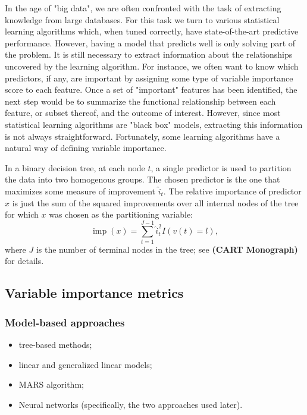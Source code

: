 \documentclass{article}
\def\ref#1{\textbf{(#1)}}
\DeclareMathOperator{\imp}{imp}
\begin{document}
In the age of "big data", we are often confronted with the task of extracting knowledge from large databases. For this task we turn to various statistical learning algorithms which, when tuned correctly, have state-of-the-art predictive performance. However, having a model that predicts well is only solving part of the problem. It is still necessary to extract information about the relationships uncovered by the learning algorithm. For instance, we often want to know which predictors, if any, are important by assigning some type of variable importance score to each feature. Once a set of "important" features has been identified, the next step would be to summarize the functional relationship between each feature, or subset thereof, and the outcome of interest. However, since most statistical learning algorithms are "black box" models, extracting this information is not always straightforward. Fortunately, some learning algorithms have a natural way of defining variable importance.

In a binary decision tree, at each node $t$, a single predictor is used to partition the data into two homogenous groups. The chosen predictor is the one that maximizes some measure of improvement $\widehat{i}_t$. The relative importance of predictor $x$ is just the sum of the squared improvements over all internal nodes of the tree for which $x$ was chosen as the partitioning variable:
\begin{equation}
\imp\left(x\right) = \sum_{t = 1}^{J - 1}\widehat{i}_t^2 I\left(v\left(t\right) = l\right),
\end{equation}
where $J$ is the number of terminal nodes in the tree; see \ref{CART Monograph} for details.


\subsection{Variable importance metrics}

\subsubsection{Model-based approaches}
\begin{itemize}
  \item tree-based methods;
  \item linear and generalized linear models;
  \item MARS algorithm;
  \item Neural networks (specifically, the two approaches used later).
\end{itemize}
\end{document}

